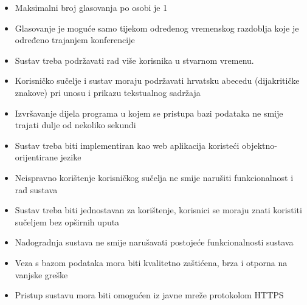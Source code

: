 			 \begin{itemize}
			 	\item Maksimalni broj glasovanja po osobi je 1
			 	\item Glasovanje je moguće samo tijekom određenog vremenskog razdoblja koje je određeno trajanjem konferencije
			 	\item Sustav treba podržavati rad više korisnika u stvarnom vremenu.
			 	\item Korisničko sučelje i sustav moraju podržavati hrvatsku abecedu (dijakritičke
			 	znakove) pri unosu i prikazu tekstualnog sadržaja
			 	\item Izvršavanje dijela programa u kojem se pristupa bazi podataka ne smije trajati dulje od nekoliko sekundi
			 	\item Sustav treba biti implementiran kao web aplikacija koristeći objektno-orijentirane
			 	jezike
			 	\item Neispravno korištenje korisničkog sučelja ne smije narušiti funkcionalnost i rad sustava
			 	\item Sustav treba biti jednostavan za korištenje, korisnici se moraju znati koristiti sučeljem bez opširnih uputa
			 	\item Nadogradnja sustava ne smije narušavati postojeće funkcionalnosti sustava
			 	\item Veza s bazom podataka mora biti kvalitetno zaštićena, brza i otporna na vanjske greške
			 	\item Pristup sustavu mora biti omogućen iz javne mreže protokolom HTTPS
			 \end{itemize}
			 
			 
			 
	